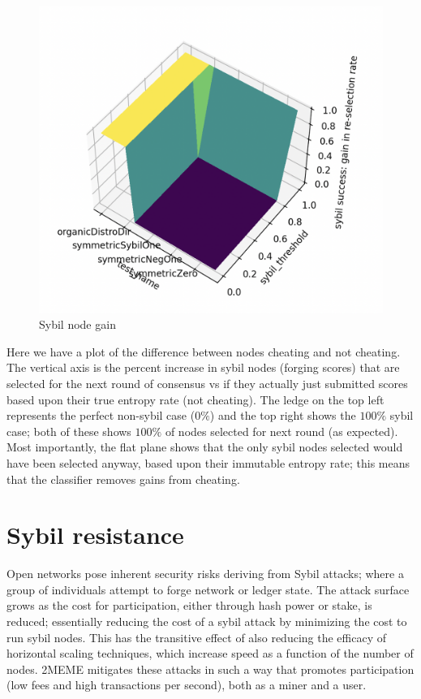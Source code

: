 \documentclass{article}
\begin{document}
\begin{figure}
\centering
\includegraphics[width=\textwidth, height=\textwidth]{attack-success-suface-plot}
\caption{Sybil node gain}
\end{figure}

Here we have a plot of the difference between nodes cheating and not cheating. The vertical axis is the percent increase in sybil nodes (forging scores) that are selected for the next round of consensus vs if they actually just submitted scores based upon their true entropy rate (not cheating). The ledge on the top left represents the perfect non-sybil case ($0\%$) and the top right shows the $100\%$ sybil case; both of these shows $100\%$ of nodes selected for next round (as expected). Most importantly, the flat plane shows that the only sybil nodes selected would have been selected anyway, based upon their immutable entropy rate; this means that the classifier removes gains from cheating.

\section{Sybil resistance}
Open networks pose inherent security risks deriving from Sybil attacks; where a group of individuals attempt to forge network or ledger state. The attack surface grows as the cost for participation, either through hash power or stake, is reduced; essentially reducing the cost of a sybil attack by minimizing the cost to run sybil nodes. This has the transitive effect of also reducing the efficacy of horizontal scaling techniques, which increase speed as a function of the number of nodes. 2MEME mitigates these attacks in such a way that promotes participation (low fees and high transactions per second), both as a miner and a user. 
\end{document}
